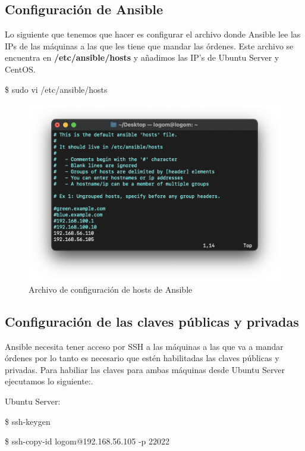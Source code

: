 \subsection{Configuración de Ansible}
Lo siguiente que tenemos que hacer es configurar el archivo donde Ansible lee las IPs de las máquinas a las que les tiene que mandar las órdenes. Este archivo
se encuentra en \textbf{/etc/ansible/hosts} y añadimos las IP’s de Ubuntu Server y CentOS.
    \begin{tcolorbox}[colback=black!10, halign=left]
        \$ sudo vi /etc/ansible/hosts
    \end{tcolorbox}
    \begin{figure}[H]
        \centering
        \includegraphics[scale=0.75]{images/ansible_hosts.png}
        \caption{Archivo de configuración de hosts de Ansible}
        \label{fig:ansible_hosts}
    \end{figure}

\subsection{Configuración de las claves públicas y privadas}
Ansible necesita tener acceso por SSH a las máquinas a las que va a mandar órdenes por lo tanto es necesario que estén habilitadas las claves públicas y
privadas. Para habiliar las claves para ambas máquinas desde Ubuntu Server ejecutamos lo siguiente:.

Ubuntu Server:
    \begin{tcolorbox}[colback=black!10, halign=left]
        \$ ssh-keygen
    \end{tcolorbox}
    \begin{tcolorbox}[colback=black!10, halign=left]
        \$ ssh-copy-id logom@192.168.56.105 -p 22022
    \end{tcolorbox}


